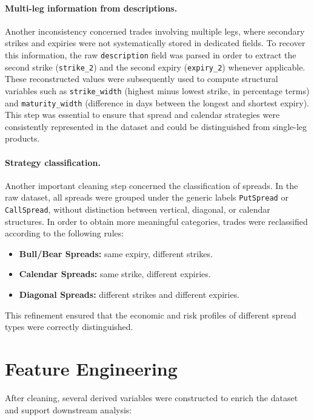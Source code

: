 \documentclass[12pt,a4paper]{report}
\begin{document}
\paragraph{Multi-leg information from descriptions.}  
Another inconsistency concerned trades involving multiple legs, where secondary strikes 
and expiries were not systematically stored in dedicated fields. To recover this information, 
the raw \texttt{description} field was parsed in order to extract the second strike 
(\texttt{strike\_2}) and the second expiry (\texttt{expiry\_2}) whenever applicable. 
These reconstructed values were subsequently used to compute structural variables such as 
\texttt{strike\_width} (highest minus lowest strike, in percentage terms) and 
\texttt{maturity\_width} (difference in days between the longest and shortest expiry). 
This step was essential to ensure that spread and calendar strategies were consistently 
represented in the dataset and could be distinguished from single-leg products.


\paragraph{Strategy classification.}  
Another important cleaning step concerned the classification of spreads. In the raw dataset, all spreads were grouped under the generic labels \texttt{PutSpread} or \texttt{CallSpread}, without distinction between vertical, diagonal, or calendar structures. In order to obtain more meaningful categories, trades were reclassified according to the following rules:
\begin{itemize}
    \item \textbf{Bull/Bear Spreads:} same expiry, different strikes.
    \item \textbf{Calendar Spreads:} same strike, different expiries.
    \item \textbf{Diagonal Spreads:} different strikes and different expiries.
\end{itemize}
This refinement ensured that the economic and risk profiles of different spread types were correctly distinguished.


\section{Feature Engineering}

After cleaning, several derived variables were constructed to enrich the dataset and support downstream analysis:
\end{document}

